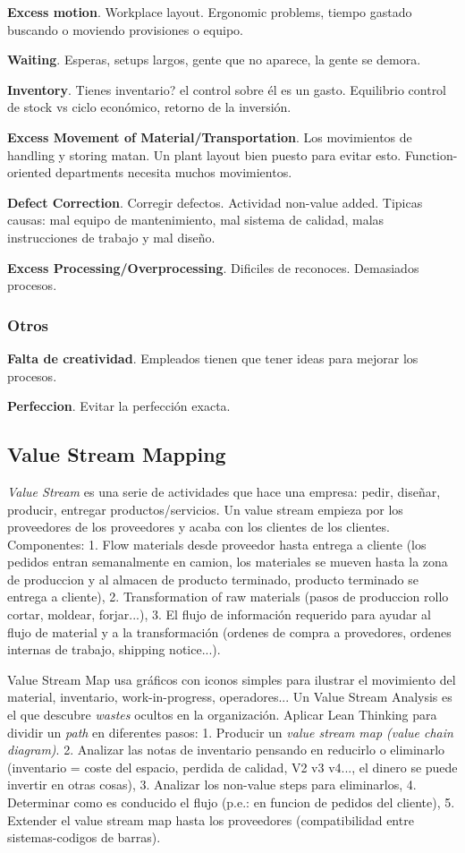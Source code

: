 \documentclass[]{article}
\begin{document}
\textbf{Excess motion}. Workplace layout. Ergonomic problems, tiempo gastado buscando o moviendo provisiones o equipo.

\textbf{Waiting}. Esperas, setups largos, gente que no aparece, la gente se demora. 

\textbf{Inventory}. Tienes inventario? el control sobre él es un gasto. Equilibrio control de stock vs ciclo económico, retorno de la inversión.

\textbf{Excess Movement of Material/Transportation}. Los movimientos de handling y storing matan. Un plant layout bien puesto para evitar esto. Function-oriented departments necesita muchos movimientos.

\textbf{Defect Correction}. Corregir defectos. Actividad non-value added. Tipicas causas: mal equipo de mantenimiento, mal sistema de calidad, malas instrucciones de trabajo y mal diseño. 

\textbf{Excess Processing/Overprocessing}. Dificiles de reconoces. Demasiados procesos. 

\subsubsection{Otros}

\textbf{Falta de creatividad}. Empleados tienen que tener ideas para mejorar los procesos.

\textbf{Perfeccion}. Evitar la perfección exacta. 

\subsection{Value Stream Mapping} 

\textit{Value Stream} es una serie de actividades que hace una empresa: pedir, diseñar, producir, entregar productos/servicios. Un value stream empieza por los proveedores de los proveedores y acaba con los clientes de los clientes. Componentes: 1. Flow materials desde proveedor hasta entrega a cliente (los pedidos entran semanalmente en camion, los materiales se mueven hasta la zona de produccion y al almacen de producto terminado, producto terminado se entrega a cliente), 2. Transformation of raw materials (pasos de produccion rollo cortar, moldear, forjar...), 3. El flujo de información requerido para ayudar al flujo de material y a la transformación (ordenes de compra a provedores, ordenes internas de trabajo, shipping notice...).

Value Stream Map usa gráficos con iconos simples para ilustrar el movimiento del material, inventario, work-in-progress, operadores... Un Value Stream Analysis es el que descubre \textit{wastes} ocultos en la organización. Aplicar Lean Thinking para dividir un \textit{path} en diferentes pasos: 1. Producir un \textit{value stream map (value chain diagram)}. 2. Analizar las notas de inventario pensando en reducirlo o eliminarlo (inventario = coste del espacio, perdida de calidad, V2 v3 v4..., el dinero se puede invertir en otras cosas), 3. Analizar los non-value steps para eliminarlos, 4. Determinar como es conducido el flujo (p.e.: en funcion de pedidos del cliente), 5. Extender el value stream map hasta los proveedores (compatibilidad entre sistemas-codigos de barras).
\end{document}
